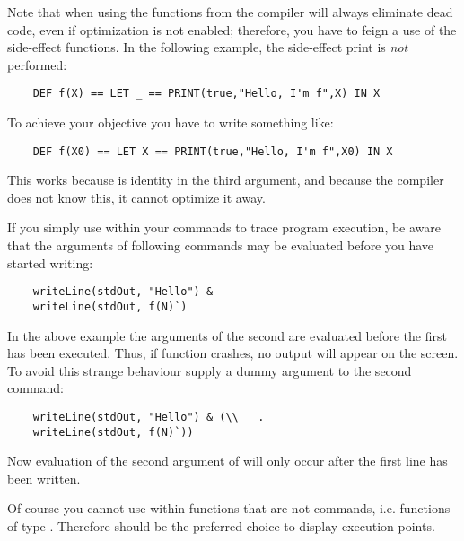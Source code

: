 Note that when using the functions from  the \opal{} compiler
will always eliminate dead code, even if optimization is not enabled;
therefore, you have to feign a use of the side-effect functions. In the
following example, the side-effect print is {\em not\/} performed:

\begin{verbatim}
    DEF f(X) == LET _ == PRINT(true,"Hello, I'm f",X) IN X
\end{verbatim}

To achieve your objective you have to write something like:

\begin{verbatim}
    DEF f(X0) == LET X == PRINT(true,"Hello, I'm f",X0) IN X
\end{verbatim}

This works because  is identity in the third argument, and
because the 
compiler does not know this, it cannot optimize it away.

If you simply use  within your commands to trace
program execution, be aware that the arguments of following commands may be
evaluated before you have started writing:
\begin{verbatim}
    writeLine(stdOut, "Hello") & 
    writeLine(stdOut, f(N)`)
\end{verbatim}
In the above example the arguments of the second  are evaluated
before the first  has been executed. Thus, if function 
crashes, no output 
will appear on the screen. To avoid this strange behaviour supply a dummy
argument to the second command: 

\begin{verbatim}
    writeLine(stdOut, "Hello") & (\\ _ .
    writeLine(stdOut, f(N)`))
\end{verbatim}
Now evaluation of the second argument of  will only occur
after the first line has been written.

Of course you cannot use  within functions that are not
commands, i.e. functions of type . Therefore 
should be the preferred choice to display execution points.



